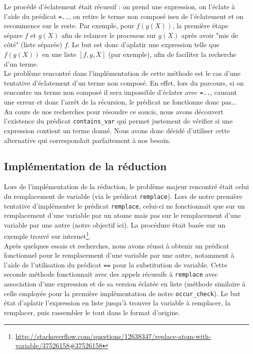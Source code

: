 \documentclass[12pt]{article} %
\begin{document}
Le procédé d'éclatement était récursif : on prend une expression, on l'éclate à l'aide du prédicat \verb|=..|, on retire le terme non composé issu de l'éclatement et on recommence sur le reste. Par exemple, pour $f(g(X))$, la première étape sépare $f$ et $g(X)$ afin de relancer le processus sur $g(X)$ après avoir "mis de côté" (liste séparée) $f$. Le but est donc d'aplatir une expression telle que $f(g(X))$ en une liste $[f, g, X]$ (par exemple), afin de faciliter la recherche d'un terme.\\

Le problème rencontré dans l'implémentation de cette méthode est le cas d'une tentative d'éclatement d'un terme non composé. En effet, lors du parcours, si on rencontre un terme non composé il sera impossible d'éclater avec \verb|=..|, causant une erreur et donc l'arrêt de la récursion, le prédicat ne fonctionne donc pas...\\

Au cours de nos recherches pour résoudre ce soucis, nous avons découvert l'existence du prédicat \verb|contains_var| qui permet justement de vérifier si une expression contient un terme donné. Nous avons donc décidé d'utiliser cette alternative qui correspondait parfaitement à nos besoin.

\subsection*{Implémentation de la réduction}

Lors de l'implémentation de la réduction, le problème majeur rencontré était celui du remplacement de variable (via le prédicat \verb|remplace|). Lors de notre première tentative d'implémenter le prédicat \verb|remplace|, celui-ci ne fonctionnait que sur un remplacement d'une variable par un atome mais pas sur le remplacement d'une variable par une autre (notre objectif ici). La procédure était basée sur un exemple trouvé sur internet\footnote{\url{http://stackoverflow.com/questions/12638347/replace-atom-with-variable/37526158\#37526158}}.\\

Après quelques essais et recherches, nous avons réussi à obtenir un prédicat fonctionnel pour le remplacement d'une variable par une autre, notamment à l'aide de l'utilisation du prédicat \verb|==| pour la substitution de variable. Cette seconde méthode fonctionnait avec des appels récursifs à \verb|remplace| avec association d'une expression et de sa version éclatée en liste (méthode similaire à celle employée pour la première implémentation de notre \verb|occur_check|). Le but état d'aplatir l'expression en liste jusqu'à trouver la variable à remplacer, la remplacer, puis rassembler le tout dans le format d'origine.\\
\end{document}

